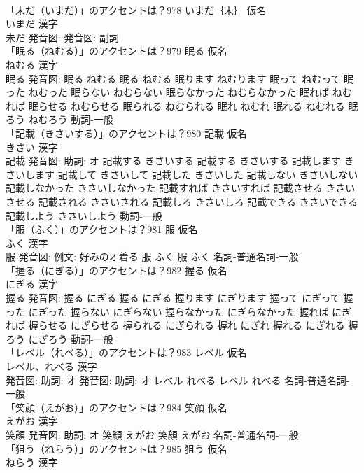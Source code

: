 \documentclass[8pt]{extreport}
\begin{document}
\begin{CJK}{UTF8}{min}
\\	「未だ（いまだ）」のアクセントは？978	いまだ｛未｝ 仮名　
\\	いまだ 漢字　
\\	未だ 発音図: 発音図:							副詞 
\\	「眠る（ねむる）」のアクセントは？979	眠る 仮名　
\\	ねむる 漢字　
\\	眠る 発音図:	眠る ねむる		眠る ねむる 眠ります ねむります 眠って ねむって 眠った ねむった 眠らない ねむらない 眠らなかった ねむらなかった 眠れば ねむれば 眠らせる ねむらせる 眠られる ねむられる 眠れ ねむれ 眠れる ねむれる 眠ろう ねむろう				動詞-一般 
\\	「記載（きさいする）」のアクセントは？980	記載 仮名　
\\	きさい 漢字　
\\	記載 発音図: 助詞: オ	記載する きさいする		記載する きさいする 記載します きさいします 記載して きさいして 記載した きさいした 記載しない きさいしない 記載しなかった きさいしなかった 記載すれば きさいすれば 記載させる きさいさせる 記載される きさいされる 記載しろ きさいしろ 記載できる きさいできる 記載しよう きさいしよう				動詞-一般 
\\	「服（ふく）」のアクセントは？981	服 仮名　
\\	ふく 漢字　
\\	服 発音図: 例文: 好みのオ着る	服 ふく		服 ふく				名詞-普通名詞-一般 
\\	「握る（にぎる）」のアクセントは？982	握る 仮名　
\\	にぎる 漢字　
\\	握る 発音図:	握る にぎる		握る にぎる 握ります にぎります 握って にぎって 握った にぎった 握らない にぎらない 握らなかった にぎらなかった 握れば にぎれば 握らせる にぎらせる 握られる にぎられる 握れ にぎれ 握れる にぎれる 握ろう にぎろう				動詞-一般 
\\	「レベル（れべる）」のアクセントは？983	レベル 仮名　
\\	レベル、れべる 漢字　
\\	発音図: 助詞: オ 発音図: 助詞: オ	レベル れべる		レベル れべる				名詞-普通名詞-一般 
\\	「笑顔（えがお）」のアクセントは？984	笑顔 仮名　
\\	えがお 漢字　
\\	笑顔 発音図: 助詞: オ	笑顔 えがお		笑顔 えがお				名詞-普通名詞-一般 
\\	「狙う（ねらう）」のアクセントは？985	狙う 仮名　
\\	ねらう 漢字　

\end{CJK}
\end{document}
